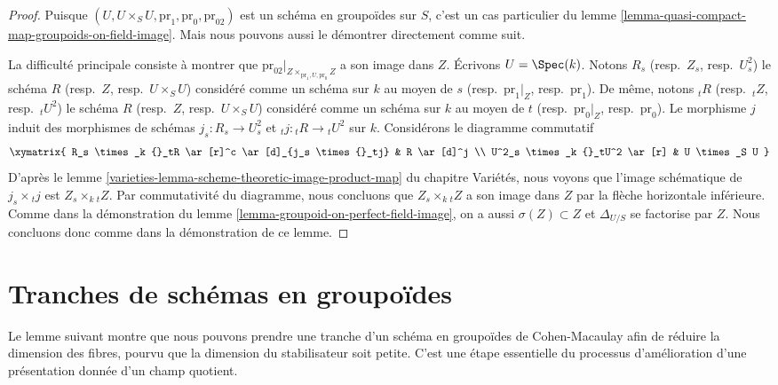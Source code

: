 \begin{proof}
Puisque $(U, U \times_S U, \text{pr}_1, \text{pr}_0, \text{pr}_{02})$
est un schéma en groupoïdes sur $S$, c'est un cas particulier du
lemme \ref{lemma-quasi-compact-map-groupoids-on-field-image}.
Mais nous pouvons aussi le démontrer directement comme suit.

\medskip\noindent
La difficulté principale consiste à montrer que
$\text{pr}_{02}|_{Z \times_{\text{pr}_1, U, \text{pr}_0} Z}$
a son image dans $Z$.
Écrivons $U = \Spec(k)$. Notons
$R_s$ (resp.\ $Z_s$, resp.\ $U^2_s$) le schéma
$R$ (resp.\ $Z$, resp.\ $U \times_S U$) considéré comme un schéma sur $k$ au moyen de
$s$ (resp.\ $\text{pr}_1|_Z$, resp.\ $\text{pr}_1$).
De même, notons
${}_tR$ (resp.\ ${}_tZ$, resp.\ ${}_tU^2$) le schéma
$R$ (resp.\ $Z$, resp.\ $U \times_S U$) considéré comme un schéma sur $k$ au moyen de
$t$ (resp.\ $\text{pr}_0|_Z$, resp.\ $\text{pr}_0$).
Le morphisme $j$ induit des morphismes de schémas
$j_s : R_s \to U^2_s$ et ${}_tj : {}_tR \to {}_tU^2$ sur $k$.
Considérons le diagramme commutatif
$$
\xymatrix{
R_s \times_k {}_tR \ar[r]^c \ar[d]_{j_s \times {}_tj} &  R \ar[d]^j \\
U^2_s \times_k {}_tU^2 \ar[r] & U \times_S U
}
$$
D'après le
lemme \ref{varieties-lemma-scheme-theoretic-image-product-map} du chapitre Variétés,
nous voyons que l'image schématique de $j_s \times {}_tj$ est
$Z_s \times_k {}_tZ$. Par commutativité du diagramme, nous
concluons que $Z_s \times_k {}_tZ$ a son image dans $Z$ par la flèche
horizontale inférieure. Comme dans la démonstration du
lemme \ref{lemma-groupoid-on-perfect-field-image},
on a aussi $\sigma(Z) \subset Z$ et
$\Delta_{U/S}$ se factorise par $Z$. Nous concluons donc comme dans la
démonstration de ce lemme.
\end{proof}







\section{Tranches de schémas en groupoïdes}
\label{section-slicing}

\noindent
Le lemme suivant montre que nous pouvons prendre une tranche d'un schéma en groupoïdes de Cohen-Macaulay
afin de réduire la dimension des fibres, pourvu que la
dimension du stabilisateur soit petite. C'est une étape essentielle du
processus d'amélioration d'une présentation donnée d'un champ quotient.

